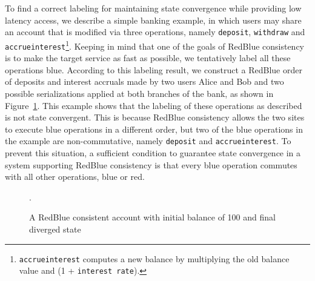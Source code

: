 \documentclass[11pt,dvipdfm]{article}
\begin{document}
To find a correct labeling for maintaining state convergence while providing low latency access, we describe a
simple banking example, in which users may share an account that is modified
via three operations, namely {\tt deposit}, {\tt withdraw} and {\tt accrueinterest}\footnote{{\tt accrueinterest}
computes a new balance by multiplying the old balance value and (1 + {\tt interest rate}).}. Keeping in mind that one of the goals of RedBlue consistency is to make the target service as fast as possible, we tentatively
label all these operations blue. According to this labeling result, we construct a RedBlue order of deposits and interest accruals made by two users Alice and Bob and two possible serializations applied at both branches
of the bank, as shown in Figure~\ref{fig:bankexample}. This example shows that the labeling of these operations as described is not state convergent. This is because
RedBlue consistency allows the two sites to execute blue operations in a different order, but
two of the blue operations in the example are non-commutative, namely
{\tt deposit} and {\tt accrueinterest}. To prevent this situation, a sufficient condition to guarantee
state convergence in a system supporting RedBlue consistency is that every blue operation commutes with all other operations, blue or red.

\begin{figure}[t]
\centering
\begin{minipage}[t]{0.46\columnwidth}
\centering
{}
\end{minipage}
\hfill
\begin{minipage}[t]{0.46\columnwidth}
\centering
{}
\end{minipage}
\caption{A RedBlue consistent account with initial balance of 100 and final diverged state}.
\label{fig:bankexample}
\end{figure}
\end{document}
